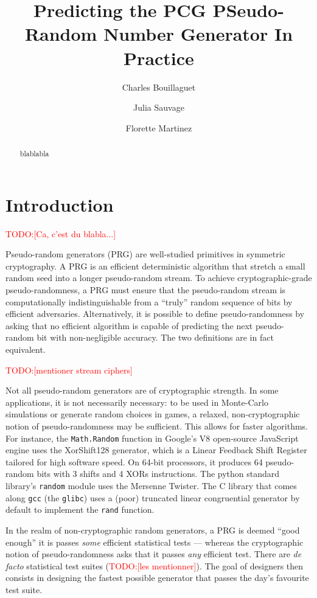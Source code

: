 \documentclass[preprint,svgnames]{iacrtrans}
\title{Predicting the PCG PSeudo-Random Number Generator In Practice}
\author{Charles Bouillaguet\inst{1} \and Julia Sauvage\inst{2} \and Florette Martinez\inst{3}}
\institute{%
University of Lille, France \\ 
\email{charles.bouillaguet@univ-lille.fr}
\and 
Sorbonne University \\
\email{julia.sauvage@etu.upmc.fr}
\and 
LIP6, CNRS, SU ? \\
\email{florette.martinez@lip6.fr}

}
\newcommand{\todo}[1]{\textcolor{red}{TODO:[#1]}}
\begin{document}
\maketitle


\begin{abstract}
  blablabla
\end{abstract}

\section{Introduction} %

\todo{Ca, c'est du blabla...}

Pseudo-random generators (PRG) are well-studied primitives in symmetric
cryptography. A PRG is an efficient deterministic algorithm that stretch a small
random seed into a longer pseudo-random stream. To achieve cryptographic-grade
pseudo-randomness, a PRG must ensure that the pseudo-random stream is
computationally indistinguishable from a ``truly'' random sequence of bits by
efficient adversaries. Alternatively, it is possible to define pseudo-randomness
by asking that no efficient algorithm is capable of predicting the next
pseudo-random bit with non-negligible accuracy. The two definitions are in fact
equivalent.

\todo{mentioner stream ciphers}

Not all pseudo-random generators are of cryptographic strength. In some
applications, it is not necessarily necessary: to be used in Monte-Carlo
simulations or generate random choices in games, a relaxed, non-cryptographic
notion of pseudo-randomness may be sufficient. This allows for faster
algorithms. For instance, the \texttt{Math.Random} function in Google's V8
open-source JavaScript engine uses the \textsf{XorShift128} generator, which is
a Linear Feedback Shift Register tailored for high software speed. On 64-bit
processors, it produces 64 pseudo-random bits with 3 shifts and 4 XORs
instructions. The \textsf{python} standard library's \texttt{random} module uses
the Mersenne Twister. The \textsf{C} library that comes along \texttt{gcc} (the
\texttt{glibc}) uses a (poor) truncated linear congruential generator by default
to implement the \texttt{rand} function.

In the realm of non-cryptographic random generators, a PRG is deemed ``good
enough'' it is passes \emph{some} efficient statistical tests --- whereas the
cryptographic notion of pseudo-randomness asks that it passes \emph{any}
efficient test. There are \textit{de facto} statistical test suites (\todo{les
  mentionner}). The goal of designers then consists in designing the fastest
possible generator that passes the day's favourite test suite.
\end{document}
